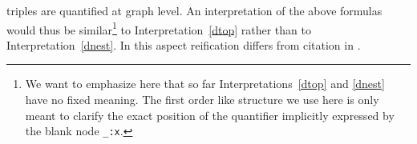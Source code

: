triples are quantified at graph level. 
An interpretation of the above formulas would thus be similar\footnote{We want to emphasize here that so far Interpretations~\ref{dtop} and \ref{dnest} have no fixed meaning. 
The first order like structure we use here is only meant to clarify the exact position of the quantifier implicitly expressed by the blank node \texttt{\_:x}.} to Interpretation~\ref{dtop} rather than to Interpretation~\ref{dnest}.
%
 In this aspect  %
 \rdf reification differs from citation in \nthree.

